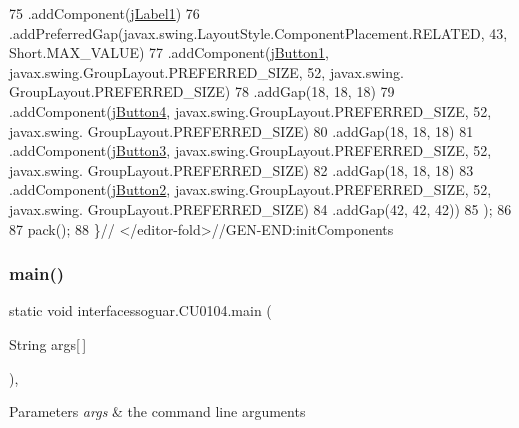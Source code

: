 \begin{DoxyCode}
75                 .addComponent(\mbox{\hyperlink{classinterfacessoguar_1_1_c_u0104_ad186ee919c545c2a04b7d0e7099a4e11}{jLabel1}})
76                 .addPreferredGap(javax.swing.LayoutStyle.ComponentPlacement.RELATED, 43, Short.MAX\_VALUE)
77                 .addComponent(\mbox{\hyperlink{classinterfacessoguar_1_1_c_u0104_a14ee464c46b5f60fbf5f0a5788fd04a8}{jButton1}}, javax.swing.GroupLayout.PREFERRED\_SIZE, 52, javax.swing.
      GroupLayout.PREFERRED\_SIZE)
78                 .addGap(18, 18, 18)
79                 .addComponent(\mbox{\hyperlink{classinterfacessoguar_1_1_c_u0104_a6330c8387302eb22ad8266154cae3b6a}{jButton4}}, javax.swing.GroupLayout.PREFERRED\_SIZE, 52, javax.swing.
      GroupLayout.PREFERRED\_SIZE)
80                 .addGap(18, 18, 18)
81                 .addComponent(\mbox{\hyperlink{classinterfacessoguar_1_1_c_u0104_a54322417464e03c0282783a3b1655cfd}{jButton3}}, javax.swing.GroupLayout.PREFERRED\_SIZE, 52, javax.swing.
      GroupLayout.PREFERRED\_SIZE)
82                 .addGap(18, 18, 18)
83                 .addComponent(\mbox{\hyperlink{classinterfacessoguar_1_1_c_u0104_a6cf10544c20d2e068ba50f9d6e620c6b}{jButton2}}, javax.swing.GroupLayout.PREFERRED\_SIZE, 52, javax.swing.
      GroupLayout.PREFERRED\_SIZE)
84                 .addGap(42, 42, 42))
85         );
86 
87         pack();
88     \}\textcolor{comment}{// </editor-fold>//GEN-END:initComponents}
\end{DoxyCode}
\mbox{\label{classinterfacessoguar_1_1_c_u0104_ac2de31f3c8284cc25328331239a9a94d}} 
\subsubsection{\texorpdfstring{main()}{main()}}
{\footnotesize\ttfamily static void interfacessoguar.\+C\+U0104.\+main (\begin{DoxyParamCaption}\item[{String}]{args\mbox{[}$\,$\mbox{]} }\end{DoxyParamCaption})\hspace{0.3cm}{\ttfamily [inline]}, {\ttfamily [static]}}


\begin{DoxyParams}{Parameters}
{\em args} & the command line arguments \\
\hline
\end{DoxyParams}

